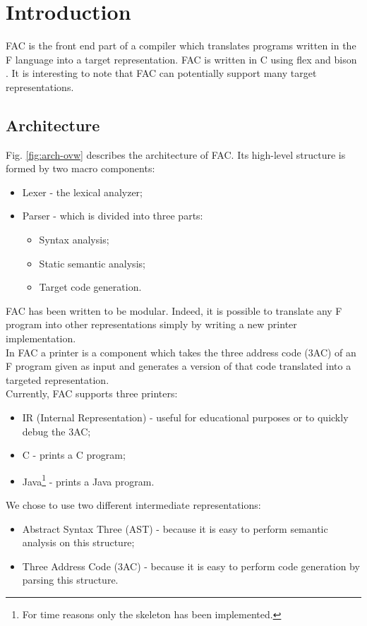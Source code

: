 \section*{Introduction}

FAC is the front end part of a compiler which translates programs written in the
F language into a target representation. FAC is written in C using
flex \cite{flex-online} and bison \cite{bison-online}.
It is interesting to note that FAC can potentially support many target
representations.

\subsection*{Architecture}
Fig. \ref{fig:arch-ovw} describes the architecture of FAC.
Its high-level structure is formed by two macro components:
\begin{itemize}
\item Lexer - the lexical analyzer;
\item Parser - which is divided into three parts:
\begin{itemize}
	\item Syntax analysis;
	\item Static semantic analysis;
	\item Target code generation.
\end{itemize}
\end{itemize}

FAC has been written to be modular. Indeed, it is possible to translate any F
program into other representations simply by writing a new printer implementation.
\\
In FAC a printer is a component which takes the three address code (3AC) of an F
program given as input and generates a version of that code translated into a targeted
representation.
\\
Currently, FAC supports three printers:
\begin{itemize}
\item IR (Internal Representation) - useful for educational purposes or to quickly debug the 3AC;
\item C - prints a C program;
\item Java\footnote{For time reasons only the skeleton has been implemented.} - prints a Java program.
\end{itemize}

We chose to use two different intermediate representations:
\begin{itemize}
\item Abstract Syntax Three (AST) - because it is easy to perform semantic analysis on this structure;
\item Three Address Code (3AC) - because it is easy to perform code generation by parsing this structure.
\end{itemize}

